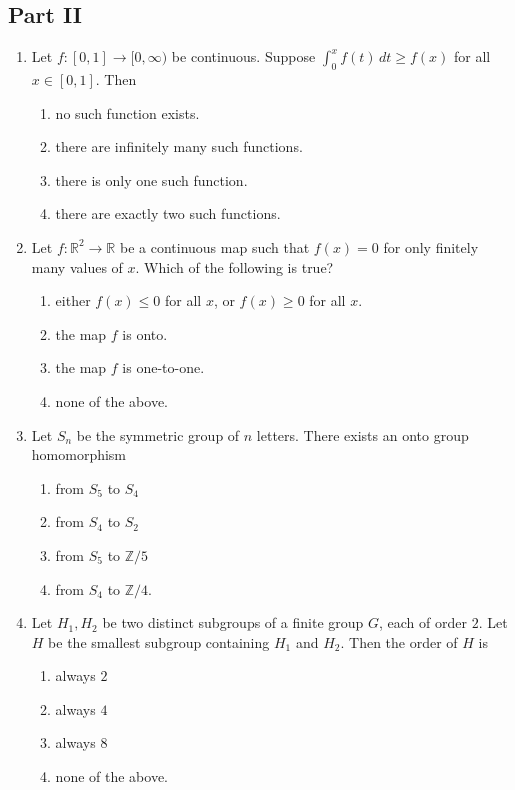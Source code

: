\documentclass[11pt, a4paper]{article}
\begin{document}
\subsection*{Part II}
\begin{enumerate}[resume]
  \item Let $f: [0, 1] \to [0, \infty)$ be continuous. Suppose $\int_0^x f(t)\,dt \ge f(x)$ for all $x \in [0, 1]$. Then
  \begin{enumerate}[label=\Alph*.]
    \item no such function exists.
    \item there are infinitely many such functions.
    \item there is only one such function.
    \item there are exactly two such functions.
  \end{enumerate}

  \item Let $f: \mathbb{R}^2 \to \mathbb{R}$ be a continuous map such that $f(x) = 0$ for only finitely many values of $x$. Which of the following is true?
  \begin{enumerate}[label=\Alph*.]
    \item either $f(x) \le 0$ for all $x$, or $f(x) \ge 0$ for all $x$.
    \item the map $f$ is onto.
    \item the map $f$ is one-to-one.
    \item none of the above.
  \end{enumerate}

  \item Let $S_n$ be the symmetric group of $n$ letters. There exists an onto group homomorphism
  \begin{enumerate}[label=\Alph*.]
    \item from $S_5$ to $S_4$
    \item from $S_4$ to $S_2$
    \item from $S_5$ to $\mathbb{Z}/5$
    \item from $S_4$ to $\mathbb{Z}/4$.
  \end{enumerate}

  \item Let $H_1, H_2$ be two distinct subgroups of a finite group $G$, each of order $2$. Let $H$ be the smallest subgroup containing $H_1$ and $H_2$. Then the order of $H$ is
  \begin{enumerate}[label=\Alph*.]
    \item always $2$
    \item always $4$
    \item always $8$
    \item none of the above.
  \end{enumerate}


\end{enumerate}
\end{document}
